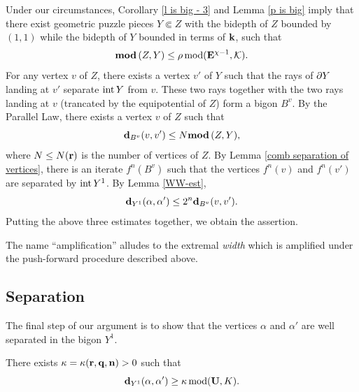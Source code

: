 \begin{pf}
  Under our circumstances,
  Corollary \ref{l is big - 3} and Lemma \ref{p is big} imply that there exist geometric puzzle pieces $Y\Subset Z$ 
with the bidepth of $Z$  bounded by $(1,1)$ while the  
bidepth of $Y$  bounded in terms of ${\mathbf{k}}$,  such that
$$
   { \mathbf{mod}\, }(Z,Y)\leq \rho  \operatorname{mod}({\mathbf{E}}^{\chi-1}, {\mathcal K}).
$$
For any vertex $v$ of $Z$, there exists a vertex $v'$ of $Y$ such that the rays of $\partial Y$ landing at $v'$
separate $\operatorname{int} Y$ from $v$. These two rays together with the two rays landing at $v$ 
(trancated by the equipotential of $Z$) form a bigon $B^v$. By the Parallel Law,
there exists a vertex $v$ of $Z$ such that
$$
          {\mathbf{d}}_{B^v}(v,v')\leq N { \mathbf{mod}\, } (Z,Y),
$$                                                                 
where $N\leq N({\mathbf{r}})$ is the number of vertices of $Z$.    
By Lemma \ref{comb separation of vertices},
there is an iterate $f^n(B^v)$ such that the vertices $f^n(v)$ and $f^n(v')$ are separated by 
$\operatorname{int} Y^1$. By Lemma \ref{WW-est}, 
$$
        {\mathbf{d}}_{Y^1} (\alpha, \alpha') \leq 2^n  {\mathbf{d}}_{B^v}(v,v').
$$
Putting  the above three estimates together, we obtain the assertion.     
\end{pf}

\begin{rem} The name ``amplification'' alludes to the extremal {\it width} which is amplified 
  under the push-forward procedure described above.
\end{rem} 

\subsection{Separation}

  The final step of our argument is to show that the vertices $\alpha$ and $\alpha'$ are
well separated in the bigon $Y^1$. 



\begin{lem}\label{main separation} 
 There exists $\kappa=\kappa({\mathbf{r}},{\mathbf{q}},{\mathbf{n}})>0$ such that   
   $$   {\mathbf{d}}_{Y^1}(\alpha, \alpha') \geq \kappa \operatorname{mod} ({\mathbf{U}},K). $$
\end{lem}

